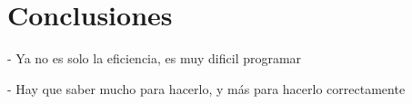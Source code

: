 \chapter{Conclusiones}

- Ya no es solo la eficiencia, es muy dificil programar

- Hay que saber mucho para hacerlo, y más para hacerlo correctamente